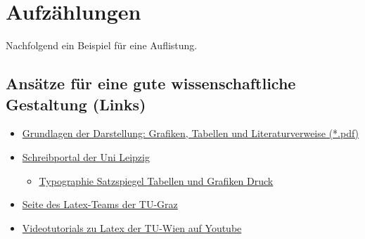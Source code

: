 \section{Aufzählungen}
\label{sec:auflistung}
Nachfolgend ein Beispiel für eine Auflistung.
\subsection{Ansätze für eine gute wissenschaftliche Gestaltung (Links)}
\label{sec:liste}
\begin{itemize}\small
	\item \href{https://timfrey.files.wordpress.com/2008/04/graph.pdf}{Grundlagen der Darstellung: Grafiken, Tabellen und Literaturverweise (*.pdf)}
	\item \href{http://home.uni-leipzig.de/schreibportal/layout-druck-2/}{Schreibportal der Uni Leipzig}
	\begin{itemize}\footnotesize
		\item \href{http://home.uni-leipzig.de/schreibportal/typographie/}{Typographie }\hspace{0.5cm}\href{http://home.uni-leipzig.de/schreibportal/satzspiegel/}{Satzspiegel }\hspace{0.5cm}\href{http://home.uni-leipzig.de/schreibportal/tabellen-grafiken/}{ Tabellen und Grafiken }\hspace{0.5cm}\href{http://home.uni-leipzig.de/schreibportal/druck/}{Druck}
	\end{itemize}
	\item \href{https://latex.tugraz.at/}{Seite des Latex-Teams der TU-Graz}
	\item \href{https://www.youtube.com/playlist?list=PLwlC-XZXtzhg4fQiZQAsXIMSRW-iZtnTQ}{Videotutorials zu Latex der TU-Wien auf Youtube}
\end{itemize}
\clearpage